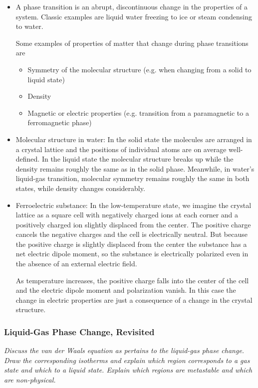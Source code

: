 \documentclass[11pt, a4paper]{article}
\begin{document}
\begin{itemize}
	\item A phase transition is an abrupt, discontinuous change in the properties of a system. Classic examples are liquid water freezing to ice or steam condensing to water.  
	
	Some examples of properties of matter that change during phase transitions are
	\begin{itemize}
		\item Symmetry of the molecular structure (e.g. when changing from a solid to liquid state)
		\item Density
		\item Magnetic or electric properties (e.g. transition from a paramagnetic to a ferromagnetic phase)
	\end{itemize}
	
	\item Molecular structure in water:  In the solid state the molecules are arranged in a crystal lattice and the positions of individual atoms are on average well-defined. In the liquid state the molecular structure breaks up while the density remains roughly the same as in the solid phase. Meanwhile, in water's liquid-gas transition, molecular symmetry remains roughly the same in both states, while density changes considerably.
	
	\item Ferroelectric substance: In the low-temperature state, we imagine the crystal lattice as a  square cell with negatively charged ions at each corner and a positively charged ion slightly displaced from the center. The positive charge cancels the negative charges and the cell is electrically neutral. But because the positive charge is slightly displaced from the center the substance has a net electric dipole moment, so the substance is electrically polarized even in the absence of an external electric field.
	
	As temperature increases, the positive charge falls into the center of the cell and the electric dipole moment and polarization vanish. In this case the change in electric properties are just a consequence of a change in the crystal structure.
	

	
\end{itemize}

\subsubsection{Liquid-Gas Phase Change, Revisited} \label{sss:liq_gas_phase_change}
\textit{Discuss the van der Waals equation as pertains to the liquid-gas phase change. Draw the corresponding isotherms and explain which region corresponds to a gas state and which to a liquid state. Explain which regions are metastable and which are non-physical.}
\end{document}
